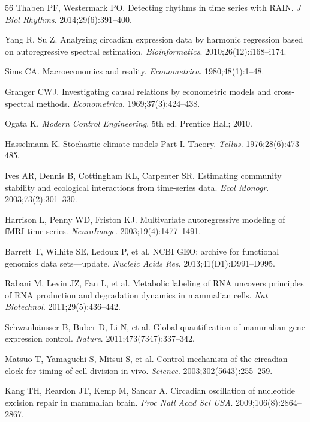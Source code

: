 \documentclass[11pt,letterpaper]{article}
\begin{document}
\begin{thebibliography}{56}
Thaben PF, Westermark PO.
Detecting rhythms in time series with RAIN.
\textit{J Biol Rhythms}. 2014;29(6):391--400.

Yang R, Su Z.
Analyzing circadian expression data by harmonic regression based on autoregressive spectral estimation.
\textit{Bioinformatics}. 2010;26(12):i168--i174.

Sims CA.
Macroeconomics and reality.
\textit{Econometrica}. 1980;48(1):1--48.

Granger CWJ.
Investigating causal relations by econometric models and cross-spectral methods.
\textit{Econometrica}. 1969;37(3):424--438.

Ogata K.
\textit{Modern Control Engineering}. 5th ed. Prentice Hall; 2010.

Hasselmann K.
Stochastic climate models Part I. Theory.
\textit{Tellus}. 1976;28(6):473--485.

Ives AR, Dennis B, Cottingham KL, Carpenter SR.
Estimating community stability and ecological interactions from time-series data.
\textit{Ecol Monogr}. 2003;73(2):301--330.

Harrison L, Penny WD, Friston KJ.
Multivariate autoregressive modeling of fMRI time series.
\textit{NeuroImage}. 2003;19(4):1477--1491.

Barrett T, Wilhite SE, Ledoux P, et al.
NCBI GEO: archive for functional genomics data sets---update.
\textit{Nucleic Acids Res}. 2013;41(D1):D991--D995.

Rabani M, Levin JZ, Fan L, et al.
Metabolic labeling of RNA uncovers principles of RNA production and degradation dynamics in mammalian cells.
\textit{Nat Biotechnol}. 2011;29(5):436--442.

Schwanh{\"a}usser B, Buber D, Li N, et al.
Global quantification of mammalian gene expression control.
\textit{Nature}. 2011;473(7347):337--342.

Matsuo T, Yamaguchi S, Mitsui S, et al.
Control mechanism of the circadian clock for timing of cell division in vivo.
\textit{Science}. 2003;302(5643):255--259.

Kang TH, Reardon JT, Kemp M, Sancar A.
Circadian oscillation of nucleotide excision repair in mammalian brain.
\textit{Proc Natl Acad Sci USA}. 2009;106(8):2864--2867.


\end{thebibliography}
\end{document}
